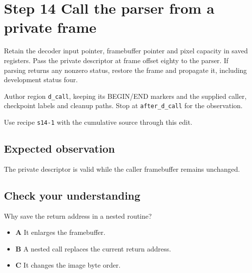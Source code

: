 \section{Step 14 Call the parser from a private frame}\label{ppm-s14}

Retain the decoder input pointer, framebuffer pointer and pixel capacity in saved registers. Pass the private descriptor at frame offset eighty to the parser. If parsing returns any nonzero status, restore the frame and propagate it, including development status four.

Author region \texttt{d\_call}, keeping its BEGIN/END markers and the supplied caller, checkpoint labels and cleanup paths. Stop at \texttt{after\_d\_call} for the observation.

Use recipe \texttt{s14-1} with the cumulative source through this edit.

\subsection{Expected observation}
The private descriptor is valid while the caller framebuffer remains unchanged.

\subsection{Check your understanding}
Why save the return address in a nested routine?

\begin{itemize}
\item \textbf{A} It enlarges the framebuffer.
\item \textbf{B} A nested call replaces the current return address.
\item \textbf{C} It changes the image byte order.
\end{itemize}
